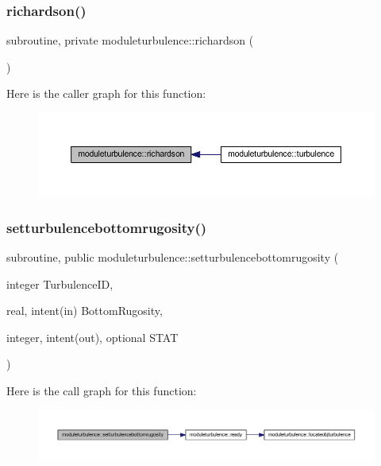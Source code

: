 \subsubsection{\texorpdfstring{richardson()}{richardson()}}
{\footnotesize\ttfamily subroutine, private moduleturbulence\+::richardson (\begin{DoxyParamCaption}{ }\end{DoxyParamCaption})\hspace{0.3cm}{\ttfamily [private]}}

Here is the caller graph for this function\+:\nopagebreak
\begin{figure}[H]
\begin{center}
\leavevmode
\includegraphics[width=350pt]{namespacemoduleturbulence_aaa0e2c6e1a9ea1d07cb81974aeb2b1f8_icgraph}
\end{center}
\end{figure}
\mbox{\label{namespacemoduleturbulence_a9df29956676b28634ce0733aa108c62e}} 
\subsubsection{\texorpdfstring{setturbulencebottomrugosity()}{setturbulencebottomrugosity()}}
{\footnotesize\ttfamily subroutine, public moduleturbulence\+::setturbulencebottomrugosity (\begin{DoxyParamCaption}\item[{integer}]{Turbulence\+ID,  }\item[{real, intent(in)}]{Bottom\+Rugosity,  }\item[{integer, intent(out), optional}]{S\+T\+AT }\end{DoxyParamCaption})}

Here is the call graph for this function\+:\nopagebreak
\begin{figure}[H]
\begin{center}
\leavevmode
\includegraphics[width=350pt]{namespacemoduleturbulence_a9df29956676b28634ce0733aa108c62e_cgraph}
\end{center}
\end{figure}
\mbox{\label{namespacemoduleturbulence_ab31d00156edd7f09041fb314d6d0445a}} 
